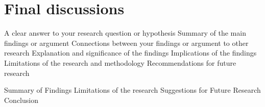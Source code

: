 


\chapter{Final discussions}
\label{ch:final-discussions}


A clear answer to your research question or hypothesis
Summary of the main findings or argument
Connections between your findings or argument to other research
Explanation and significance of the findings
Implications of the findings
Limitations of the research and methodology
Recommendations for future research

Summary of Findings
Limitations of the research
Suggestions for Future Research
Conclusion













